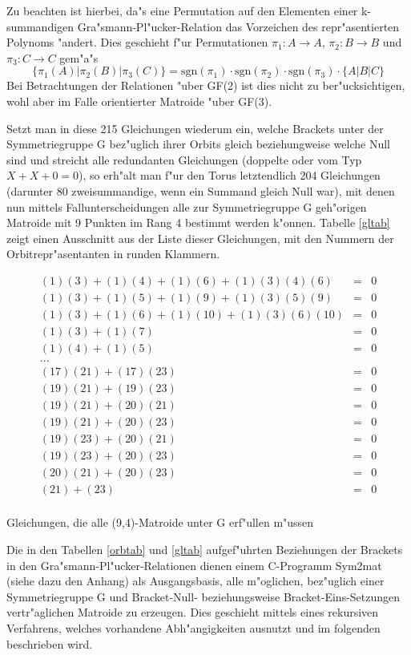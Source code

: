 Zu beachten ist hierbei, da"s eine Permutation auf den Elementen einer
k-sum\-man\-di\-gen Gra"smann-Pl"ucker-Relation das Vorzeichen des
repr"asentierten Polynoms "andert. Dies geschieht f"ur Permutationen
$\pi_1:A\to A$, $\pi_2:B\to B$ und $\pi_3:C\to C$ gem"a"s
$$\{\pi_1(A)|\pi_2(B)|\pi_3(C)\} =
\mbox{sgn}(\pi_1)\cdot\mbox{sgn}(\pi_2)\cdot\mbox{sgn}(\pi_3)\cdot\{A|B|C\}$$
Bei Betrachtungen der Relationen "uber GF(2) ist dies nicht zu ber"ucksichtigen,
wohl aber im Falle orientierter Matroide "uber GF(3).

Setzt man in diese 215 Gleichungen wiederum ein, welche Brackets unter der
Symmetriegruppe G bez"uglich ihrer Orbits gleich beziehungweise welche Null
sind und streicht alle redundanten Gleichungen (doppelte oder vom Typ
$X + X + 0 = 0$), so erh"alt man f"ur den Torus letztendlich 204 Gleichungen
(darunter 80 zweisummandige, wenn ein Summand gleich Null war), mit denen nun
mittels Fallunterscheidungen alle zur Symmetriegruppe G geh"origen Matroide
mit 9 Punkten im Rang 4 bestimmt werden k"onnen. Tabelle \ref{gltab} zeigt
einen Ausschnitt aus der Liste dieser Gleichungen, mit den Nummern der
Orbitrepr"asentanten in runden Klammern.

\begin{table}[htb]
{\small
$$
\begin{array}{lll}
(1)(3)+(1)(4)+(1)(6)+(1)(3)(4)(6) & = & 0 \\
(1)(3)+(1)(5)+(1)(9)+(1)(3)(5)(9) & = & 0 \\
(1)(3)+(1)(6)+(1)(10)+(1)(3)(6)(10) & = & 0 \\
(1)(3)+(1)(7) & = & 0 \\
(1)(4)+(1)(5) & = & 0 \\
... & & \\
(17)(21)+(17)(23) & = & 0 \\
(19)(21)+(19)(23) & = & 0 \\
(19)(21)+(20)(21) & = & 0 \\
(19)(21)+(20)(23) & = & 0 \\
(19)(23)+(20)(21) & = & 0 \\
(19)(23)+(20)(23) & = & 0 \\
(20)(21)+(20)(23) & = & 0 \\
(21)+(23) & = & 0 \\
\end{array}$$}
\caption{Gleichungen, die alle (9,4)-Matroide unter G erf"ullen m"ussen}
\label{gltab}
\end{table}

Die in den Tabellen \ref{orbtab} und \ref{gltab} aufgef"uhrten Beziehungen
der Brackets in den Gra"smann-Pl"ucker-Relationen dienen einem C-Programm
{\sc Sym2mat} (siehe dazu den Anhang) als Ausgangsbasis, alle m"oglichen,
bez"uglich einer Symmetriegruppe G und Bracket-Null- beziehungsweise
Bracket-Eins-Setzungen vertr"aglichen Matroide zu erzeugen. Dies geschieht
mittels eines rekursiven Verfahrens, welches vorhandene Abh"angigkeiten
ausnutzt und im folgenden beschrieben wird.

